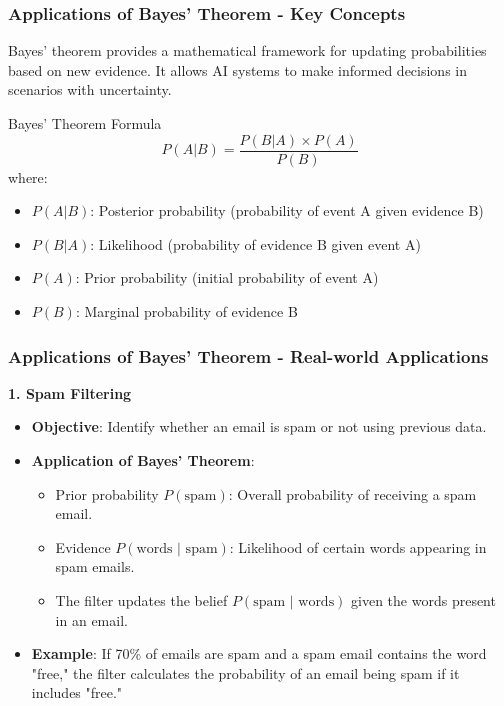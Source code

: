 \documentclass[aspectratio=169]{beamer}
\begin{document}
\begin{frame}[fragile]
    \frametitle{Applications of Bayes' Theorem - Key Concepts}
    Bayes' theorem provides a mathematical framework for updating probabilities based on new evidence. It allows AI systems to make informed decisions in scenarios with uncertainty.

    \begin{block}{Bayes' Theorem Formula}
        \begin{equation}
            P(A|B) = \frac{P(B|A) \times P(A)}{P(B)}
        \end{equation}
        where:
        \begin{itemize}
            \item \(P(A|B)\): Posterior probability (probability of event A given evidence B)
            \item \(P(B|A)\): Likelihood (probability of evidence B given event A)
            \item \(P(A)\): Prior probability (initial probability of event A)
            \item \(P(B)\): Marginal probability of evidence B
        \end{itemize}
    \end{block}
\end{frame}

\begin{frame}[fragile]
    \frametitle{Applications of Bayes' Theorem - Real-world Applications}
    \textbf{1. Spam Filtering}
    \begin{itemize}
        \item \textbf{Objective}: Identify whether an email is spam or not using previous data.
        \item \textbf{Application of Bayes' Theorem}:
        \begin{itemize}
            \item Prior probability \(P(\text{spam})\): Overall probability of receiving a spam email.
            \item Evidence \(P(\text{words | spam})\): Likelihood of certain words appearing in spam emails.
            \item The filter updates the belief \(P(\text{spam | words})\) given the words present in an email.
        \end{itemize}
        \item \textbf{Example}: If 70\% of emails are spam and a spam email contains the word "free," the filter calculates the probability of an email being spam if it includes "free."
    \end{itemize}
\end{frame}
\end{document}
